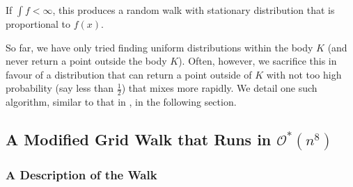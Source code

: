 If $\int f < \infty$, this produces a random walk with stationary distribution that is proportional to $f(x)$.

So far, we have only tried finding uniform distributions within the body $K$ (and never return a point outside the body $K$). Often, however, we sacrifice this in favour of a distribution that can return a point outside of $K$ with not too high probability (say less than $\frac{1}{2}$) that mixes more rapidly. We detail one such algorithm, similar to that in \cite{dyer-frieze-sample-outside}, in the following section.

\subsection{A Modified Grid Walk that Runs in \texorpdfstring{$\mathcal{O}^*(n^8)$}{O(n8)}}

\subsubsection{A Description of the Walk}

